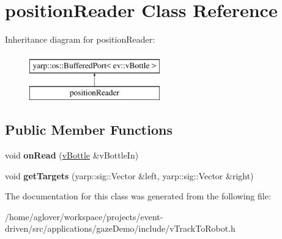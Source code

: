 \hypertarget{classpositionReader}{}\section{position\+Reader Class Reference}
\label{classpositionReader}
Inheritance diagram for position\+Reader\+:\begin{figure}[H]
\begin{center}
\leavevmode
\includegraphics[height=2.000000cm]{classpositionReader}
\end{center}
\end{figure}
\subsection*{Public Member Functions}
\begin{DoxyCompactItemize}
\item 
void {\bfseries on\+Read} (\hyperlink{classev_1_1vBottle}{v\+Bottle} \&v\+Bottle\+In)\hypertarget{classpositionReader_a0cc3a67998f2205a786794730250b9c2}{}\label{classpositionReader_a0cc3a67998f2205a786794730250b9c2}

\item 
void {\bfseries get\+Targets} (yarp\+::sig\+::\+Vector \&left, yarp\+::sig\+::\+Vector \&right)\hypertarget{classpositionReader_a9f4f82b17b54dd6776eb29269ab043ce}{}\label{classpositionReader_a9f4f82b17b54dd6776eb29269ab043ce}

\end{DoxyCompactItemize}


The documentation for this class was generated from the following file\+:\begin{DoxyCompactItemize}
\item 
/home/aglover/workspace/projects/event-\/driven/src/applications/gaze\+Demo/include/v\+Track\+To\+Robot.\+h\end{DoxyCompactItemize}
